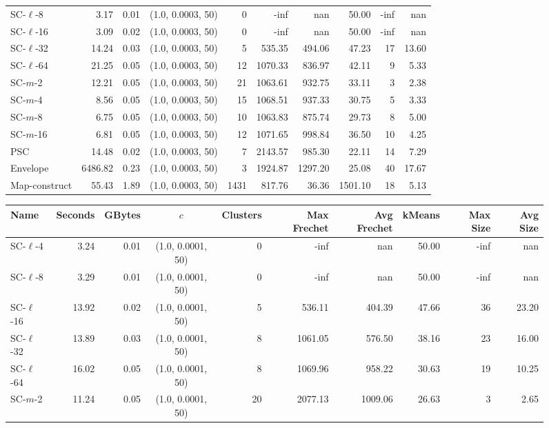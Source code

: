 \begin{figure}
\begin{center}
\begin{minipage}{\textwidth}
{\begin{tabular}{@{}lrrcrrrrrr@{}}
        SC-$\ell$-8 & 3.17 & 0.01 & (1.0, 0.0003, 50) & 0 & -inf & nan & 50.00 & -inf & nan\\
        SC-$\ell$-16 & 3.09 & 0.02 & (1.0, 0.0003, 50) & 0 & -inf & nan & 50.00 & -inf & nan\\
        SC-$\ell$-32 & 14.24 & 0.03 & (1.0, 0.0003, 50) & 5 & 535.35 & 494.06 & 47.23 & 17 & 13.60\\
        SC-$\ell$-64 & 21.25 & 0.05 & (1.0, 0.0003, 50) & 12 & 1070.33 & 836.97 & 42.11 & 9 & 5.33\\
        SC-$m$-2 & 12.21 & 0.05 & (1.0, 0.0003, 50) & 21 & 1063.61 & 932.75 & 33.11 & 3 & 2.38\\
        SC-$m$-4 & 8.56 & 0.05 & (1.0, 0.0003, 50) & 15 & 1068.51 & 937.33 & 30.75 & 5 & 3.33\\
        SC-$m$-8 & 6.75 & 0.05 & (1.0, 0.0003, 50) & 10 & 1063.83 & 875.74 & 29.73 & 8 & 5.00\\
        SC-$m$-16 & 6.81 & 0.05 & (1.0, 0.0003, 50) & 12 & 1071.65 & 998.84 & 36.50 & 10 & 4.25\\
        PSC & 14.48 & 0.02 & (1.0, 0.0003, 50) & 7 & 2143.57 & 985.30 & 22.11 & 14 & 7.29\\
        Envelope & 6486.82 & 0.23 & (1.0, 0.0003, 50) & 3 & 1924.87 & 1297.20 & 25.08 & 40 & 17.67\\
        Map-construct & 55.43 & 1.89 & (1.0, 0.0003, 50) & 1431 & 817.76 & 36.36 & 1501.10 & 18 & 5.13\\
        \bottomrule
    \end{tabular}
    }
    {
    \begin{tabular}{@{}lrrcrrrrrr@{}}
        \toprule
        Name & Seconds & GBytes & $c$ & Clusters & Max Frechet & Avg Frechet & kMeans & Max Size & Avg Size\\
        \midrule
        SC-$\ell$-4 & 3.24 & 0.01 & (1.0, 0.0001, 50) & 0 & -inf & nan & 50.00 & -inf & nan\\
        SC-$\ell$-8 & 3.29 & 0.01 & (1.0, 0.0001, 50) & 0 & -inf & nan & 50.00 & -inf & nan\\
        SC-$\ell$-16 & 13.92 & 0.02 & (1.0, 0.0001, 50) & 5 & 536.11 & 404.39 & 47.66 & 36 & 23.20\\
        SC-$\ell$-32 & 13.89 & 0.03 & (1.0, 0.0001, 50) & 8 & 1061.05 & 576.50 & 38.16 & 23 & 16.00\\
        SC-$\ell$-64 & 16.02 & 0.05 & (1.0, 0.0001, 50) & 8 & 1069.96 & 958.22 & 30.63 & 19 & 10.25\\
        SC-$m$-2 & 11.24 & 0.05 & (1.0, 0.0001, 50) & 20 & 2077.13 & 1009.06 & 26.63 & 3 & 2.65\\

\end{tabular}}
\end{minipage}
\end{center}
\end{figure}
